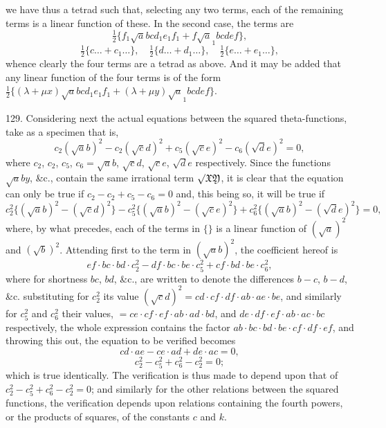 \documentclass[11pt,a4paper]{book}
\begin{document}
\newpage
\setcounter{page}{553}

\noindent
we have thus a tetrad such that, selecting any two terms, each of the remaining terms is a linear function of these. In the second case, the terms are
\[
\tfrac12 \{f_1 \surd abc d_1 e_1 f_1 + f \surd a_1 bcde f\},
\]
\[
\tfrac12 \{c \dots + c_1 \dots \},\quad
\tfrac12 \{d \dots + d_1 \dots \},\quad
\tfrac12 \{e \dots + e_1 \dots \},
\]
whence clearly the four terms are a tetrad as above. And it may be added that any linear function of the four terms is of the form $\tfrac12 \{(\lambda + \mu x)\surd abc d_1 e_1 f_1 + (\lambda + \mu y)\surd a_1 bcde f\}$.

129. Considering next the actual equations between the squared theta-functions, take as a specimen that is,
\[
c_2 (\surd ab)^2 - c_2 (\surd cd)^2 + c_5 (\surd ce)^2 - c_6 (\surd de)^2 = 0,
\]
where $c_2$, $c_2$, $c_5$, $c_6 = \surd ab$, $\surd cd$, $\surd ce$, $\surd de$ respectively. Since the functions $\surd aby$, \&c., contain the same irrational term $\surd\mathfrak{XY}$, it is clear that the equation can only be true if $c_2 - c_2 + c_5 - c_6 = 0$ and, this being so, it will be true if
\[
c_2^2 \{(\surd ab)^2 - (\surd cd)^2\} - c_5^2 \{(\surd ab)^2 - (\surd ce)^2\} + c_6^2 \{(\surd ab)^2 - (\surd de)^2\} = 0,
\]
where, by what precedes, each of the terms in $\{\}$ is a linear function of $(\surd a)^2$ and $(\surd b)^2$. Attending first to the term in $(\surd ab)^2$, the coefficient hereof is
\[
ef \cdot bc \cdot bd \cdot c_2^2 - df \cdot bc \cdot be \cdot c_5^2 + cf \cdot bd \cdot be \cdot c_6^2,
\]
where for shortness $bc$, $bd$, \&c., are written to denote the differences $b - c$, $b - d$, \&c. substituting for $c_2^2$ its value $(\surd cd)^2 = cd \cdot cf \cdot df \cdot ab \cdot ae \cdot be$, and similarly for $c_5^2$ and $c_6^2$ their values, $= ce \cdot cf \cdot ef \cdot ab \cdot ad \cdot bd$, and $de \cdot df \cdot ef \cdot ab \cdot ac \cdot bc$ respectively, the whole expression contains the factor $ab \cdot bc \cdot bd \cdot be \cdot cf \cdot df \cdot ef$, and throwing this out, the equation to be verified becomes
\[
cd \cdot ae - ce \cdot ad + de \cdot ac = 0,
\]
\[
c_2^2 - c_5^2 + c_6^2 - c_2^2 = 0;
\]
which is true identically. The verification is thus made to depend upon that of $c_2^2 - c_5^2 + c_6^2 - c_2^2 = 0$; and similarly for the other relations between the squared functions, the verification depends upon relations containing the fourth powers, or the products of squares, of the constants $c$ and $k$.
\end{document}
